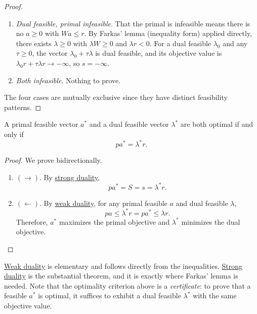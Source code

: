 \begin{proof}
\begin{enumerate}
			\item \textit{Dual feasible, primal infeasible}. That the primal is infeasible means there is no $a \geq 0$ with $Wa \leq r$. By Farkas' lemma (inequality form) applied directly, there exists $\lambda \geq 0$ with $\lambda W \geq 0$ and $\lambda r < 0$. For a dual feasible $\lambda_0$ and any $\tau \geq 0$, the vector $\lambda_0 + \tau \lambda$ is dual feasible, and its objective value is $\lambda_0 r + \tau \lambda r \to -\infty$, so $s = -\infty$. 

			\item \textit{Both infeasible}. Nothing to prove. 
		\end{enumerate}
		The four cases are mutually exclusive since they have distinct feasibility patterns. 
	\end{proof}

	\begin{corollary}
	  \label{thm:primal-dual-optimality-criterion}
		A primal feasible vector $a^\ast$ and a dual feasible vector $\lambda^\ast$ are both optimal if and only if
		\begin{equation}
			pa^\ast = \lambda^\ast r.
		\end{equation}
	\end{corollary}
	\begin{proof}
		We prove bidirectionally. 
		\begin{enumerate}
			\item $(\rightarrow)$. By \hyperref[thm:strong-duality]{strong duality},
				\begin{equation}
					pa^\ast = S = s = \lambda^\ast r.
				\end{equation}
			\item $(\leftarrow)$. By \hyperref[thm:weak-duality]{weak duality}, for any primal feasible $a$ and dual feasible $\lambda$,
				\begin{equation}
					pa \leq \lambda^\ast r
					= pa^\ast \leq \lambda r.
				\end{equation}
			Therefore, $a^\ast$ maximizes the primal objective and $\lambda^\ast$ minimizes the dual objective.
		\end{enumerate}
	\end{proof}

	\hyperref[thm:weak-duality]{Weak duality} is elementary and follows directly from the inequalities. \hyperref[thm:strong-duality]{Strong duality} is the substantial theorem, and it is exactly where Farkas' lemma is needed. Note that the optimality criterion above is a \textit{certificate}: to prove that a feasible $a^\ast$ is optimal, it suffices to exhibit a dual feasible $\lambda^\ast$ with the same objective value.

